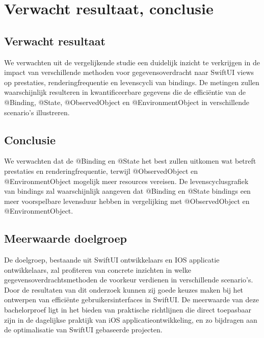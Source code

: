 \section{Verwacht resultaat, conclusie}
\label{sec:verwachte_resultaten}


\subsection{Verwacht resultaat}
We verwachten uit de vergelijkende studie een duidelijk inzicht te verkrijgen in de impact van verschillende methoden voor gegevensoverdracht naar SwiftUI views op prestaties, renderingfrequentie en levenscycli van bindings. De metingen zullen waarschijnlijk resulteren in kwantificeerbare gegevens die de efficiëntie van de @Binding, @State, @ObservedObject en @EnvironmentObject in verschillende scenario's illustreren.

\subsection{Conclusie}
We verwachten dat de @Binding en @State het best zullen uitkomen wat betreft prestaties en renderingfrequentie, terwijl @ObservedObject en @EnvironmentObject mogelijk meer resources vereisen. De levenscyclusgrafiek van bindings zal waarschijnlijk aangeven dat @Binding en @State bindings een meer voorspelbare levensduur hebben in vergelijking met @ObservedObject en @EnvironmentObject.

\subsection{Meerwaarde doelgroep}
De doelgroep, bestaande uit SwiftUI ontwikkelaars en IOS applicatie ontwikkelaars, zal profiteren van concrete inzichten in welke gegevensoverdrachtsmethoden de voorkeur verdienen in verschillende scenario's. Door de resultaten van dit onderzoek kunnen zij goede keuzes maken bij het ontwerpen van efficiënte gebruikersinterfaces in SwiftUI. De meerwaarde van deze bachelorproef ligt in het bieden van praktische richtlijnen die direct toepasbaar zijn in de dagelijkse praktijk van iOS applicatieontwikkeling, en zo bijdragen aan de optimalisatie van SwiftUI gebaseerde projecten.


